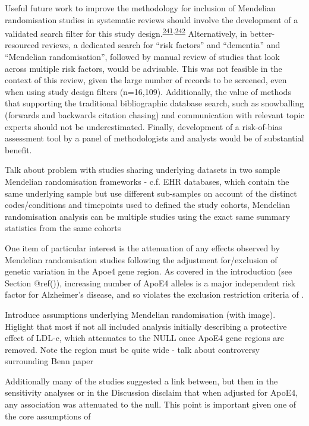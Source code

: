 \documentclass[a4paper, twoside]{templates/ociamthesis}
\begin{document}
Useful future work to improve the methodology for inclusion of Mendelian randomisation studies in systematic reviews should involve the development of a validated search filter for this study design.\textsuperscript{\protect\hyperlink{ref-waffenschmidt2020}{241},\protect\hyperlink{ref-wagner2020}{242}} Alternatively, in better-resourced reviews, a dedicated search for ``risk factors'' and ``dementia'' and ``Mendelian randomisation'', followed by manual review of studies that look across multiple risk factors, would be advisable. This was not feasible in the context of this review, given the large number of records to be screened, even when using study design filters (n=16,109). Additionally, the value of methods that supporting the traditional bibliographic database search, such as snowballing (forwards and backwards citation chasing) and communication with relevant topic experts should not be underestimated. Finally, development of a risk-of-bias assessment tool by a panel of methodologists and analysts would be of substantial benefit.

Talk about problem with studies sharing underlying datasets in two sample Mendelian randomisation frameworks - c.f. EHR databases, which contain the same underlying sample but use different sub-samples on account of the distinct codes/conditions and timepoints used to defined the study cohorts, Mendelian randomisation analysis can be multiple studies using the exact same summary statistics from the same cohorts

One item of particular interest is the attenuation of any effects observed by Mendelian randomisation studies following the adjustment for/exclusion of genetic variation in the Apoe4 gene region. As covered in the introduction (see Section @ref()), increasing number of ApoE4 alleles is a major independent risk factor for Alzheimer's disease, and so violates the exclusion restriction criteria of .

Introduce assumptions underlying Mendelian randomisation (with image). Higlight that most if not all included analysis initially describing a protective effect of LDL-c, which attenuates to the NULL once ApoE4 gene regions are removed. Note the region must be quite wide - talk about controversy surrounding Benn paper

Additionally many of the studies suggested a link between, but then in the sensitivity analyses or in the Discussion disclaim that when adjusted for ApoE4, any association was attenuated to the null. This point is important given one of the core assumptions of
\end{document}

